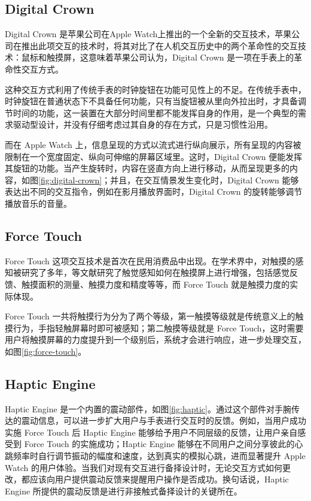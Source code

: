 \subsection{Digital Crown}

Digital Crown 是苹果公司在Apple Watch上推出的一个全新的交互技术，苹果公司在推出此项交互的技术时，将其对比了在人机交互历史中的两个革命性的交互技术：鼠标和触摸屏，这意味着苹果公司认为，Digital Crown 是一项在手表上的革命性交互方式。

这种交互方式利用了传统手表的时钟旋钮在功能可见性上的不足。在传统手表中，时钟旋钮在普通状态下不具备任何功能，只有当旋钮被从里向外拉出时，才具备调节时间的功能，这一装置在大部分时间里都不能发挥自身的作用，是一个典型的需求驱动型设计，并没有仔细考虑过其自身的存在方式，只是习惯性沿用。

而在 Apple Watch 上，信息呈现的方式以流式进行纵向展示，所有呈现的内容被限制在一个宽度固定、纵向可伸缩的屏幕区域里。这时，Digital Crown 便能发挥其旋钮的功能。当产生旋转时，内容在竖直方向上进行移动，从而呈现更多的内容，如图\ref{fig:digital-crown}；并且，在交互情景发生变化时，Digital Crown 能够表达出不同的交互指令，例如在影月播放界面时，Digital Crown 的旋转能够调节播放音乐的音量。

\subsection{Force Touch}

Force Touch 这项交互技术是首次在民用消费品中出现。在学术界中，对触摸的感知被研究了多年，\cite{Boring:2012ea,Buschek:2015cd,Vogel:2007:STO:1240624.1240727}等文献研究了触觉感知如何在触摸屏上进行增强，包括感觉反馈、触摸面积的测量、触摸力度和精度等等，而 Force Touch 就是触摸力度的实际体现。

Force Touch 一共将触摸行为分为了两个等级，第一触摸等级就是传统意义上的触摸行为，手指轻触屏幕时即可被感知；第二触摸等级就是 Force Touch，这时需要用户将触摸屏幕的力度提升到一个级别后，系统才会进行响应，进一步处理交互，如图\ref{fig:force-touch}。

\subsection{Haptic Engine}

Haptic Engine 是一个内置的震动部件，如图\ref{fig:haptic}。通过这个部件对手腕传达的震动信息，可以进一步扩大用户与手表进行交互时的反馈。例如，当用户成功实施 Force Touch 后 Haptic Engine 能够给予用户不同层级的反馈，让用户亲自感受到 Force Touch 的实施成功；Haptic Engine 能够在不同用户之间分享彼此的心跳频率时自行调节振动的幅度和速度，达到真实的模拟心跳，进而显著提升 Apple Watch 的用户体验。当我们对现有交互进行备择设计时，无论交互方式如何更改，都应该向用户提供震动反馈来提醒用户操作是否成功。换句话说，Haptic Engine 所提供的震动反馈是进行非接触式备择设计的关键所在。


